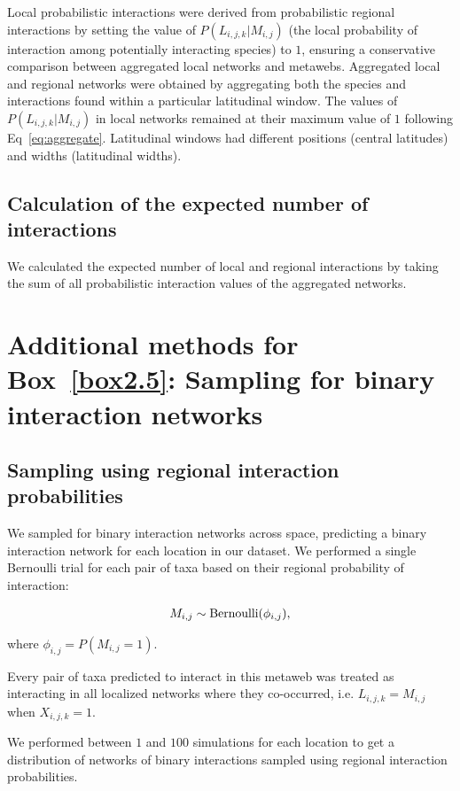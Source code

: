 \begin{refsection}
Local probabilistic interactions were derived from probabilistic regional
interactions by setting the value of $P(L_{i, j, k}|M_{i,j})$ (the local
probability of interaction among potentially interacting species) to $1$,
ensuring a conservative comparison between aggregated local networks and
metawebs. Aggregated local and regional networks were obtained by aggregating
both the species and interactions found within a particular latitudinal window.
The values of $P(L_{i, j, k}|M_{i, j})$ in local networks remained at their
maximum value of $1$ following Eq~\ref{eq:aggregate}. Latitudinal windows had
different positions (central latitudes) and widths (latitudinal widths).

\subsection{Calculation of the expected number of interactions}

We calculated the expected number of local and regional interactions by taking
the sum of all probabilistic interaction values of the aggregated networks. 

\section{Additional methods for Box~\ref{box2.5}: Sampling for binary interaction networks}

\subsection{Sampling using regional interaction probabilities}

We sampled for binary interaction networks across space, predicting a binary
interaction network for each location in our dataset. We performed a single
Bernoulli trial for each pair of taxa based on their regional probability of
interaction: 

\begin{eqnarray}
    \label{eq:sampling1}
    M_{i, j} \sim {\rm Bernoulli}(\phi_{i,j}),
  \end{eqnarray}
  
where $\phi_{i,j} = P(M_{i, j} = 1)$.

Every pair of taxa predicted to interact in this metaweb was treated as
interacting in all localized networks where they co-occurred, i.e. $L_{i, j, k}
= M_{i, j}$ when $X_{i,j,k} = 1$.

We performed between $1$ and $100$ simulations for each location to get a
distribution of networks of binary interactions sampled using regional
interaction probabilities.


\end{refsection}
